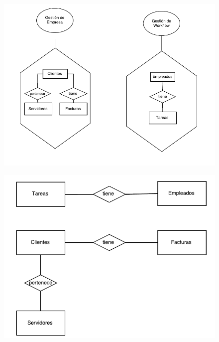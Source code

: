 \documentclass[paper=a4, fontsize=11pt, spanish]{scrartcl}
\begin{document}
\begin{figure}
	\includegraphics[width=1.25\textwidth]{exArmazonF.png}
	\caption{}
	\label{fig:exArmazonF}
\end{figure}

\begin{figure}
	\includegraphics{ArmazonD.png}
	\caption{}
	\label{fig:armazonD}
\end{figure}
\end{document}
